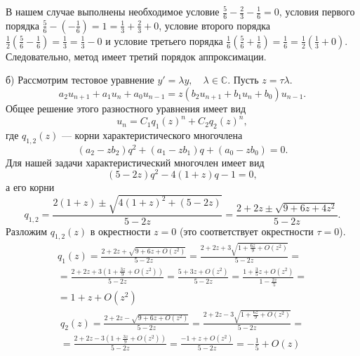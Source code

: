\documentclass[12pt]{article}
\begin{document}
В нашем случае выполнены необходимое условие $\frac{5}{6} - \frac{2}{3} - \frac{1}{6} = 0$, 
условия первого порядка $\frac{5}{6} - \left(-\frac{1}{6}\right) = 1 = \frac{1}{3} + \frac{2}{3} + 0$, условие второго порядка $\frac{1}{2}\left(\frac{5}{6} - \frac{1}{6}\right) = \frac{1}{3} = \frac{1}{3} - 0$ и условие третьего порядка $\frac{1}{6}\left(\frac{5}{6} + \frac{1}{6}\right) = \frac{1}{6} = \frac{1}{2}\left(\frac{1}{3} + 0\right)$. Следовательно, метод имеет третий порядок аппроксимации.

б) Рассмотрим тестовое уравнение $y' = \lambda y, \quad \lambda \in \mathbb{C}$. Пусть $z = \tau \lambda$.
\[
a_2 u_{n+1} + a_1 u_{n} + a_0 u_{n-1} = z (b_2 u_{n+1} + b_1 u_{n} + b_0) u_{n-1}.
\]
Общее решение этого разностного уравнения имеет вид
\[
u_n = C_1 q_1(z)^n + C_2 q_2(z)^n,
\]
где $q_{1,2}(z)$ --- корни характеристического многочлена
\[
(a_2 - z b_2) q^2 + (a_1 - z b_1) q + (a_0 - z b_0) = 0.
\]
Для нашей задачи характеристический многочлен имеет вид
\[
(5 - 2z) q^2 - 4(1 + z) q - 1 = 0,
\]
а его корни
\[
q_{1,2} = \frac{2(1 + z) \pm \sqrt{4(1+z)^2 + (5-2z)}}{5 - 2z} = 
\frac{2 + 2z \pm \sqrt{9 + 6z + 4z^2}}{5 - 2z}.
\]
Разложим $q_{1,2}(z)$ в окрестности $z = 0$ (это соответствует окрестности $\tau = 0$).
\begin{multline*}
q_1(z) = \frac{2 + 2z + \sqrt{9 + 6z + O(z^2)}}{5 - 2z} = 
\frac{2 + 2z + 3\sqrt{1 + \frac{6z}{9} + O(z^2)}}{5 - 2z} = \\ =
\frac{2 + 2z + 3(1 + \frac{3z}{9} + O(z^2))}{5 - 2z} = 
\frac{5 + 3z + O(z^2)}{5 - 2z} = 
\frac{1 + \frac{3}{5}z + O(z^2)}{1 - \frac{2z}{5}} = \\ =
1 + z + O(z^2)
\end{multline*}
\begin{multline*}
q_2(z) = \frac{2 + 2z - \sqrt{9 + 6z + O(z^2)}}{5 - 2z} = 
\frac{2 + 2z - 3\sqrt{1 + \frac{6z}{9} + O(z^2)}}{5 - 2z} = \\ =
\frac{2 + 2z - 3(1 + \frac{3z}{9} + O(z^2))}{5 - 2z} = 
\frac{-1 + z + O(z^2)}{5 - 2z} =  -\frac{1}{5} + O(z)
\end{multline*}
\end{document}
